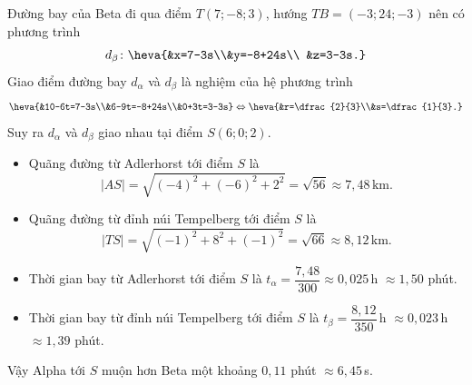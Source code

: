 \begin{bt}
{		 Đường bay của Beta đi qua điểm
		$T(7;-8;3)$,  hướng $TB=(-3; 24;-3)$ nên có phương trình \[d_{\beta}\colon\heva{&x=7-3s\\&y=-8+24s\\ &z=3-3s.}\]
		Giao  điểm đường bay $d_{\alpha}$ và $d_{\beta}$ là nghiệm của hệ phương trình \[\heva{&10-6t=7-3s\\&6-9t=-8+24s\\&0+3t=3-3s}\Leftrightarrow \heva{&r=\dfrac{2}{3}\\&s=\dfrac{1}{3}.}\]
		Suy ra $d_{\alpha}$ và  $d_{\beta}$ giao nhau tại điểm $S(6;0;2)$.\\
		\begin{itemize}
			\item  Quãng đường từ Adlerhorst tới điểm $S$ là \[\left|AS\right|=\sqrt{(-4)^2+(-6)^2+2^2}=\sqrt{56}\approx7{,}48\,\mathrm{km}.\]
			\item Quãng đường từ  đỉnh núi Tempelberg tới điểm $S$ là \[\left|TS\right|=\sqrt{(-1)^2+8^2+(-1)^2}=\sqrt{66}\approx8{,}12\,\mathrm{km}.\]
			\item Thời gian bay từ Adlerhorst tới điểm $S$ là $t_{\alpha}=\dfrac{7{,}48}{300}\approx 0{,}025$\,h $\approx 1{,}50$  phút.
			 \item Thời gian bay từ đỉnh núi Tempelberg tới điểm $S$ là $ t_{\beta}=\dfrac{8{,}12}{350}$\,h $\approx0{,}023$\,h $\approx1{,}39$ phút.
		\end{itemize}
		Vậy Alpha tới  $S$ muộn hơn Beta một khoảng $0{,}11$ phút $\approx 6{,}45$\,s.
	 }
\end{bt}

